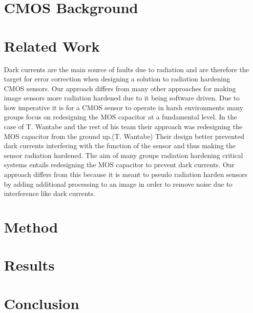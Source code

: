 \documentclass[journal]{IEEEtran}
\begin{document}
\section{CMOS Background}


\section{Related Work} 
Dark currents are the main source of faults due to radiation and are therefore the target for error correction when designing a solution to radiation hardening CMOS sensors.  Our approach differs from many other approaches for making image sensors more radiation hardened due to it being software driven.  Due to how imperative it is for a CMOS sensor to operate in harsh environments many groups focus on redesigning the MOS capacitor at a fundamental level.  In the case of T. Wantabe and the rest of his team their approach was redesigning the MOS capacitor from the ground up.(T. Wantabe)  Their design better prevented dark currents interfering with the function of the sensor and thus making the sensor radiation hardened.  The aim of many groups radiation hardening critical systems entails redesigning the MOS capacitor to prevent dark currents.  Our approach differs from this because it is meant to pseudo radiation harden sensors by adding additional processing to an image in order to remove noise due to interference like dark currents.  

\section{Method}

\section{Results}

\section{Conclusion}



{\footnotesize

}
\end{document}
